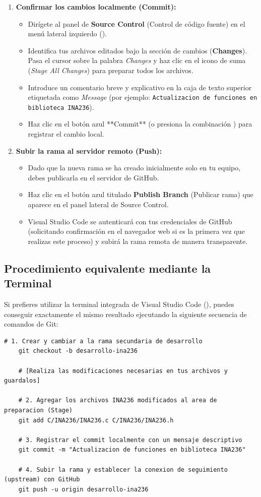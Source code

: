 \documentclass[
10pt, %
a4paper, %
oneside, %
headinclude,footinclude, %
BCOR5mm, %
]{scrartcl}
\begin{document}
\begin{enumerate}
	\item \textbf{Confirmar los cambios localmente (Commit):}
	\begin{itemize}
		\item Dirígete al panel de \textbf{Source Control} (Control de código fuente) en el menú lateral izquierdo ().
		\item Identifica tus archivos editados bajo la sección de cambios (\textbf{Changes}). Pasa el cursor sobre la palabra \textit{Changes} y haz clic en el icono de suma \textbf{\keys{+}} (\textit{Stage All Changes}) para preparar todos los archivos.
		\item Introduce un comentario breve y explicativo en la caja de texto superior etiquetada como \textit{Message} (por ejemplo: \texttt{Actualizacion de funciones en biblioteca INA236}).
		\item Haz clic en el botón azul **Commit** (o presiona la combinación ) para registrar el cambio local.
	\end{itemize}
	
	\item \textbf{Subir la rama al servidor remoto (Push):}
	\begin{itemize}
		\item Dado que la nueva rama se ha creado inicialmente solo en tu equipo, debes publicarla en el servidor de GitHub.
		\item Haz clic en el botón azul titulado \textbf{Publish Branch} (Publicar rama) que aparece en el panel lateral de Source Control.
		\item Visual Studio Code se autenticará con tus credenciales de GitHub (solicitando confirmación en el navegador web si es la primera vez que realizas este proceso) y subirá la rama remota de manera transparente.
	\end{itemize}
\end{enumerate}

\subsection{Procedimiento equivalente mediante la Terminal}
Si prefieres utilizar la terminal integrada de Visual Studio Code (), puedes conseguir exactamente el mismo resultado ejecutando la siguiente secuencia de comandos de Git:

\begin{lstlisting}[style=CMakeStyle]
	# 1. Crear y cambiar a la rama secundaria de desarrollo
	git checkout -b desarrollo-ina236
	
	# [Realiza las modificaciones necesarias en tus archivos y guardalos]
	
	# 2. Agregar los archivos INA236 modificados al area de preparacion (Stage)
	git add C/INA236/INA236.c C/INA236/INA236.h
	
	# 3. Registrar el commit localmente con un mensaje descriptivo
	git commit -m "Actualizacion de funciones en biblioteca INA236"
	
	# 4. Subir la rama y establecer la conexion de seguimiento (upstream) con GitHub
	git push -u origin desarrollo-ina236
\end{lstlisting}
\end{document}
